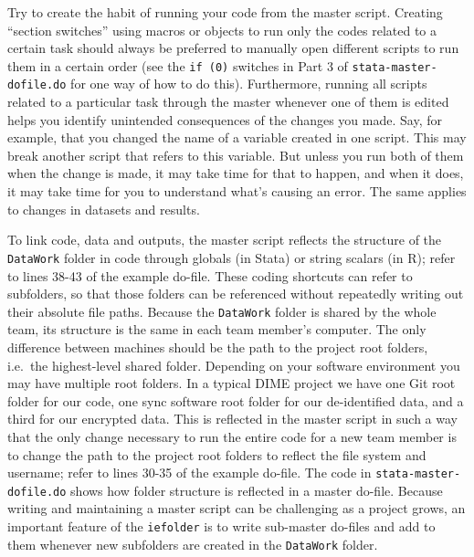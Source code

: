 \documentclass[
]{book}
\begin{document}
Try to create the habit of running your code from the master script.
Creating ``section switches'' using macros or objects to run only the codes related to a certain task
should always be preferred to manually open different scripts to run them in a certain order
(see the \texttt{if\ (0)} switches in Part 3 of \texttt{stata-master-dofile.do} for one way of how to do this).
Furthermore, running all scripts related to a particular task through the master whenever one of them is edited
helps you identify unintended consequences of the changes you made.
Say, for example, that you changed the name of a variable created in one script.
This may break another script that refers to this variable.
But unless you run both of them when the change is made, it may take time for that to happen,
and when it does, it may take time for you to understand what's causing an error.
The same applies to changes in datasets and results.

To link code, data and outputs,
the master script reflects the structure of the \texttt{DataWork} folder in code
through globals (in Stata) or string scalars (in R);
refer to lines 38-43 of the example do-file.
These coding shortcuts can refer to subfolders,
so that those folders can be referenced without repeatedly writing out their absolute file paths.
Because the \texttt{DataWork} folder is shared by the whole team,
its structure is the same in each team member's computer.
The only difference between machines should be
the path to the project root folders, i.e.~the highest-level shared folder.
Depending on your software environment you may have multiple root folders.
In a typical DIME project we have one Git root folder for our code,
one sync software root folder for our de-identified data,
and a third for our encrypted data.
This is reflected in the master script in such a way that
the only change necessary to run the entire code for a new team member
is to change the path to the project root folders
to reflect the file system and username;
refer to lines 30-35 of the example do-file.
The code in \texttt{stata-master-dofile.do} shows how folder structure is reflected in a master do-file.
Because writing and maintaining a master script can be challenging as a project grows,
an important feature of the \texttt{iefolder} is to write sub-master do-files
and add to them whenever new subfolders are created in the \texttt{DataWork} folder.
\end{document}
